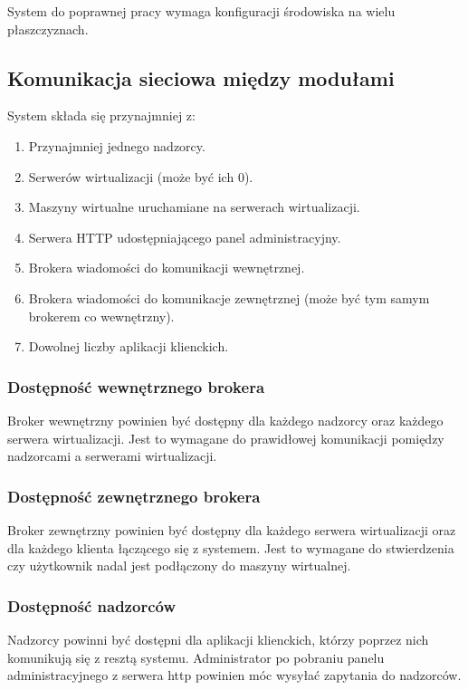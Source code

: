 \documentclass[../opis-rozwiazania.tex]{subfiles}
\begin{document}
\label{system_requirements}
	
System do poprawnej pracy wymaga konfiguracji środowiska na wielu płaszczyznach.
	
\subsection{Komunikacja sieciowa między modułami}
System składa się przynajmniej z:
\begin{enumerate}
	\item Przynajmniej jednego nadzorcy.
	\item Serwerów wirtualizacji (może być ich 0).
	\item Maszyny wirtualne uruchamiane na serwerach wirtualizacji.
	\item Serwera HTTP udostępniającego panel administracyjny.
	\item Brokera wiadomości do komunikacji wewnętrznej.
	\item Brokera wiadomości do komunikacje zewnętrznej (może być tym samym brokerem co wewnętrzny).
	\item Dowolnej liczby aplikacji klienckich.
\end{enumerate}

\subsubsection{Dostępność wewnętrznego brokera}
Broker wewnętrzny powinien być dostępny dla każdego nadzorcy oraz każdego serwera wirtualizacji.
Jest to wymagane do prawidłowej komunikacji pomiędzy nadzorcami a serwerami wirtualizacji.

\subsubsection{Dostępność zewnętrznego brokera}
Broker zewnętrzny powinien być dostępny dla każdego serwera wirtualizacji oraz dla każdego klienta łączącego się z systemem.
Jest to wymagane do stwierdzenia czy użytkownik nadal jest podłączony do maszyny wirtualnej. 

\subsubsection{Dostępność nadzorców}
Nadzorcy powinni być dostępni dla aplikacji klienckich, którzy poprzez nich komunikują się z resztą systemu. 
Administrator po pobraniu panelu administracyjnego z serwera http powinien móc wysyłać zapytania do nadzorców.
\end{document}
